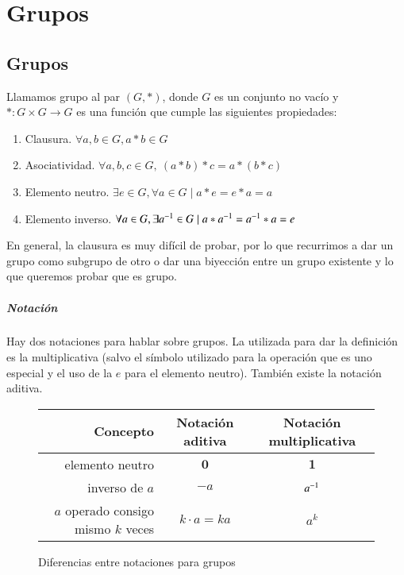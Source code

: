 \chapter{Grupos}

\section{Grupos}

\begin{dfn}[Grupo]
	Llamamos grupo al par $(G, \ast)$, donde $G$ es un conjunto no vacío y $\ast: G \times G \to G$ es una función que cumple las siguientes propiedades:
	\begin{enumerate}
		\item Clausura. $\forall a, b \in G, a \ast b \in G$
		\item Asociatividad. $\forall a, b, c \in G,\ (a \ast b) \ast c = a \ast (b \ast c)$
		\item Elemento neutro. $\exists e \in G, \forall a \in G \mid a \ast e = e \ast a = a$
		\item Elemento inverso. $\forall a \in G, \exists a^{-1} \in G \mid a \ast a^{-1} = a^{-1} \ast a = e$
	\end{enumerate}
\end{dfn}

En general, la clausura es muy difícil de probar, por lo que recurrimos a dar un grupo como subgrupo de otro o dar una biyección entre un grupo existente y lo que queremos probar que es grupo.

\paragraph{Notación}

Hay dos notaciones para hablar sobre grupos. La utilizada para dar la definición es la multiplicativa (salvo el símbolo utilizado para la operación que es uno especial y el uso de la $e$ para el elemento neutro). También existe la notación aditiva.
\begin{figure}[h]
	\centering
	{\renewcommand{\arraystretch}{1.2}
		\begin{tabular}{|r|cc|}
			\hline
			Concepto & \textbf{Notación aditiva} & \textbf{Notación multiplicativa} \\\hline
			elemento neutro & $\mathbf{0}$ & $\mathbf{1}$ \\
			inverso de $a$ & $-a$ & $a^{-1}$ \\
			$a$ operado consigo mismo $k$ veces & $k\cdot a = ka$ & $a^k$ \\\hline
			
	\end{tabular}}
	\caption{Diferencias entre notaciones para grupos}
\end{figure}



